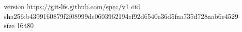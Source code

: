 version https://git-lfs.github.com/spec/v1
oid sha256:b4399160879f2f08999de0603962194ef92d6540e36d5faa735d728aab6e4529
size 16480
